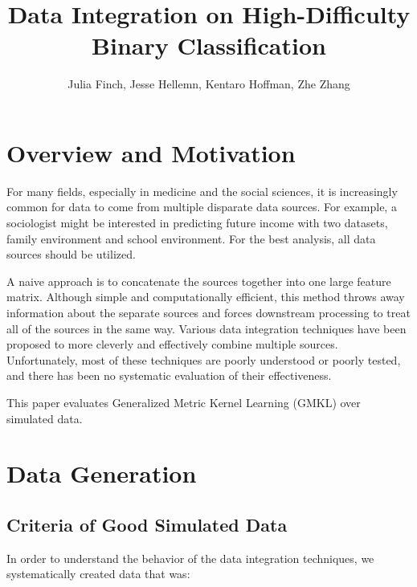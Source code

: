 \documentclass{article}
\begin{document}
\title{Data Integration on High-Difficulty Binary Classification}
\author{Julia Finch, Jesse Hellemn, Kentaro Hoffman, Zhe Zhang}
\maketitle


\section{Overview and Motivation}
For many fields, especially in medicine and the social sciences, it is
increasingly common for data to come from multiple disparate data sources. For
example, a sociologist might be interested in predicting future income with two
datasets, family environment and school environment. For the best analysis, all
data sources should be utilized.


A naive approach is to concatenate the sources together into one large feature
matrix. Although simple and computationally efficient, this method throws away
information about the separate sources and forces downstream processing to
treat all of the sources in the same way. Various data integration techniques
have been proposed to more cleverly and effectively combine multiple sources.
Unfortunately, most of these techniques are poorly understood or poorly tested,
and there has been no systematic evaluation of their effectiveness.


This paper evaluates Generalized Metric Kernel Learning (GMKL) over simulated
data.


\section{Data Generation}

\subsection{Criteria of Good Simulated Data}

In order to understand the behavior of the data integration techniques, we
systematically created data that was:
\end{document}
